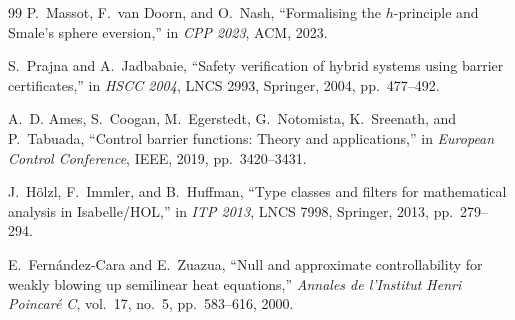 \documentclass[11pt,a4paper]{article}
\theoremstyle{plain}
\theoremstyle{definition}
\theoremstyle{remark}
\begin{document}
\begin{thebibliography}{99}
P.~Massot, F.~van Doorn, and O.~Nash,
``Formalising the $h$-principle and Smale's sphere eversion,''
in \emph{CPP 2023}, ACM, 2023.

S.~Prajna and A.~Jadbabaie,
``Safety verification of hybrid systems using barrier certificates,''
in \emph{HSCC 2004}, LNCS 2993, Springer, 2004, pp.~477--492.

A.~D. Ames, S.~Coogan, M.~Egerstedt, G.~Notomista, K.~Sreenath,
and P.~Tabuada,
``Control barrier functions: Theory and applications,''
in \emph{European Control Conference}, IEEE, 2019, pp.~3420--3431.

J.~H\"olzl, F.~Immler, and B.~Huffman,
``Type classes and filters for mathematical analysis in Isabelle/HOL,''
in \emph{ITP 2013}, LNCS 7998, Springer, 2013, pp.~279--294.

E.~Fern\'{a}ndez-Cara and E.~Zuazua,
``Null and approximate controllability for weakly blowing up semilinear
heat equations,''
\emph{Annales de l'Institut Henri Poincar\'{e} C}, vol.~17, no.~5,
pp.~583--616, 2000.

\end{thebibliography}
\end{document}
